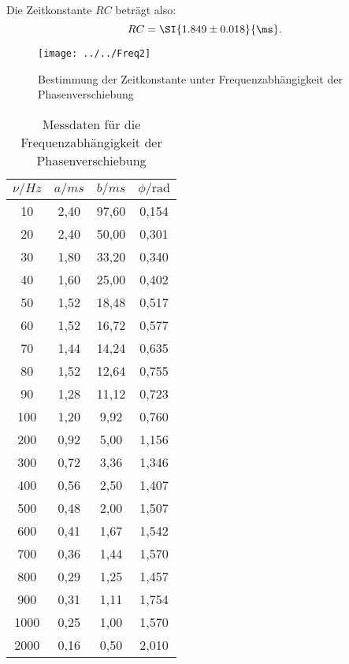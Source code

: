 Die Zeitkonstante $RC$ beträgt also:
\begin{equation*}
RC = \SI{1.849 \pm 0.018}{\ms}.
\end{equation*}
\begin{figure}[h!]
	\centering
	\texttt{[image: ../../Freq2]}
	\caption{Bestimmung der Zeitkonstante unter Frequenzabhängigkeit der Phasenverschiebung}
	\label{fig:freq2}
\end{figure}
\begin{table}[htbp]
	\centering
	\caption{Messdaten für die Frequenzabhängigkeit der Phasenverschiebung}
	\label{tab:Frequenzphase}
	\begin{tabular}{c c c c}
		\toprule
		$\nu / \si{Hz} $ & $ a / \si{ms}$ & $ b / \si{ms}$ & $\phi / \text{rad}$ \\
		\midrule
	    10 & 2,40 & 97,60 & 0,154 \\
	    20 & 2,40 & 50,00 & 0,301 \\
	    30	& 1,80 & 33,20 & 0,340 \\
	    40	& 1,60& 25,00 & 0,402 \\
	    50	& 1,52 & 18,48 & 0,517 \\
	    60	& 1,52 & 16,72 & 0,577 \\
	    70	& 1,44 & 14,24 & 0,635 \\
	    80	& 1,52 & 12,64 & 0,755 \\
	    90	& 1,28 & 11,12 & 0,723 \\
	    100	& 1,20 & 9,92 & 0,760 \\
	    200	& 0,92 & 5,00 & 1,156 \\
	    300	& 0,72 & 3,36 & 1,346 \\
	    400	& 0,56 & 2,50 & 1,407 \\
	    500	& 0,48 & 2,00 & 1,507 \\
	    600	& 0,41 & 1,67 & 1,542 \\
	    700	& 0,36 & 1,44 & 1,570 \\
	    800	& 0,29 & 1,25 & 1,457 \\
	    900	& 0,31 & 1,11 & 1,754 \\
	    1000 & 0,25 & 1,00 & 1,570 \\
	    2000 & 0,16 & 0,50 & 2,010 \\
		\bottomrule
	\end{tabular}
\end{table}
\FloatBarrier
